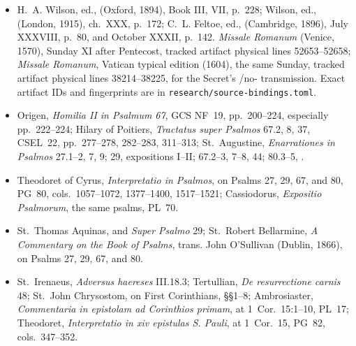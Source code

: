 {\begin{itemize}[itemsep=0em,topsep=0.15em,parsep=0pt]
\emph{Liber Psalmorum}, discussion ``De Psalmis Asaphi nomine inscriptis,''
printed pp.~217--218,
.
\item H.~A. Wilson, ed., 
(Oxford, 1894), Book III, VII, p.~228; Wilson, ed.,
(London, 1915), ch.~XXX, p.~172; C.~L. Feltoe, ed.,
(Cambridge, 1896), July XXXVIII, p.~80, and October XXXII, p.~142.
\emph{Missale Romanum} (Venice, 1570), Sunday XI after Pentecost, tracked
artifact physical lines 52653--52658; \emph{Missale Romanum}, Vatican typical
edition (1604), the same Sunday, tracked artifact physical lines 38214--38225,
for the Secret's /no- transmission. Exact artifact IDs and
fingerprints are in \texttt{research/source-bindings.toml}.
\item Origen, \emph{Homilia II in Psalmum 67}, GCS NF~19, pp.~200--224,
especially pp.~222--224; Hilary of Poitiers, \emph{Tractatus super Psalmos}
67.2, 8, 37, CSEL~22, pp.~277--278, 282--283, 311--313; St.~Augustine,
\emph{Enarrationes in Psalmos} 27.1--2, 7, 9; 29,
expositions I--II; 67.2--3, 7--8, 44; 80.3--5,
.
\item Theodoret of Cyrus, \emph{Interpretatio in Psalmos}, on Psalms 27, 29,
67, and 80, PG~80, cols.~1057--1072, 1377--1400, 1517--1521; Cassiodorus,
\emph{Expositio Psalmorum}, the same psalms, PL~70.
\item St.~Thomas Aquinas,  and
\emph{Super Psalmo} 29; St.~Robert Bellarmine, \emph{A Commentary on the
Book of Psalms}, trans. John O'Sullivan (Dublin, 1866), on Psalms 27, 29, 67,
and 80.
\item St.~Irenaeus, \emph{Adversus haereses} III.18.3; Tertullian,
\emph{De resurrectione carnis} 48; St.~John Chrysostom,
 on First Corinthians, §§1--8;
Ambrosiaster, \emph{Commentaria in epistolam ad Corinthios primam}, at
1~Cor.~15:1--10, PL~17; Theodoret, \emph{Interpretatio in xiv epistulas
S. Pauli}, at 1~Cor.~15, PG~82, cols.~347--352.

\end{itemize}}
